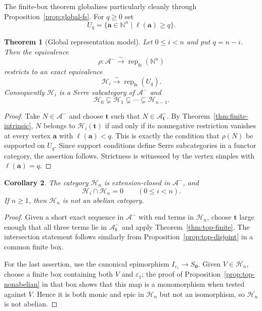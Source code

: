 \documentclass[12pt,reqno]{amsart}
\newtheorem{theorem}{Theorem}[section]
\newtheorem{corollary}[theorem]{Corollary}
\theoremstyle{definition}
\theoremstyle{remark}
\newcommand{\Rep}{\operatorname{rep}}
\begin{document}
The finite-box theorem globalizes particularly cleanly through Proposition~\ref{prop:global-fs}.  For $q\ge0$ set
\[
U_q=\{\mathbf a\in\mathbb N^n\mid \ell(\mathbf a)\ge q\}.
\]

\begin{theorem}[Global representation model]\label{thm:global-model}
Let $0\le i<n$ and put $q=n-i$.  Then the equivalence
\[
\rho:\mathcal A^-\xrightarrow{\sim}\Rep_{\mathrm{fs}}(\mathbb N^n)
\]
restricts to an exact equivalence
\[
\mathcal H_i\xrightarrow{\sim}\Rep_{\mathrm{fs}}(U_q).
\]
Consequently $\mathcal H_i$ is a Serre subcategory of $\mathcal A^-$ and
\[
\mathcal H_0\subsetneq\mathcal H_1\subsetneq\cdots\subsetneq\mathcal H_{n-1}.
\]
\end{theorem}

\begin{proof}
Take $N\in\mathcal A^-$ and choose $\mathbf t$ such that $N\in\mathcal A^-_{\mathbf t}$.  By Theorem~\ref{thm:finite-intrinsic}, $N$ belongs to $\mathcal H_i(\mathbf t)$ if and only if its nonnegative restriction vanishes at every vertex $\mathbf a$ with $\ell(\mathbf a)<q$.  This is exactly the condition that $\rho(N)$ be supported on $U_q$.  Since support conditions define Serre subcategories in a functor category, the assertion follows.  Strictness is witnessed by the vertex simples with $\ell(\mathbf a)=q$.
\end{proof}

\begin{corollary}\label{cor:global-top}
The category $\mathcal H_n$ is extension-closed in $\mathcal A^-$, and
\[
\mathcal H_i\cap\mathcal H_n=0
\qquad(0\le i<n).
\]
If $n\ge1$, then $\mathcal H_n$ is not an abelian category.
\end{corollary}

\begin{proof}
Given a short exact sequence in $\mathcal A^-$ with end terms in
$\mathcal H_n$, choose $\mathbf t$ large enough that all three terms lie in
$\mathcal A^-_{\mathbf t}$ and apply Theorem~\ref{thm:top-finite}.  The
intersection statement follows similarly from
Proposition~\ref{prop:top-disjoint} in a common finite box.

For the last assertion, use the canonical epimorphism
$I_{\varepsilon_1}\to S_{\mathbf0}$.  Given $V\in\mathcal H_n$, choose a
finite box containing both $V$ and $\varepsilon_1$; the proof of
Proposition~\ref{prop:top-nonabelian} in that box shows that this map is a
monomorphism when tested against $V$.  Hence it is both monic and epic in
$\mathcal H_n$ but not an isomorphism, so $\mathcal H_n$ is not abelian.
\end{proof}
\end{document}
